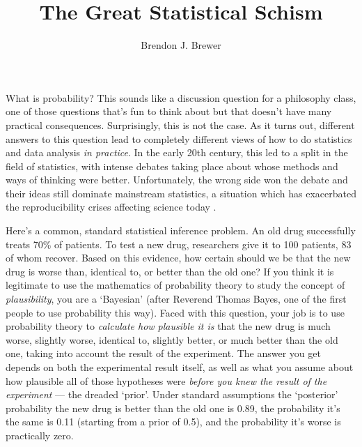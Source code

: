 \documentclass[a4paper, 12pt]{article}
\title{The Great Statistical Schism}
\author{Brendon J. Brewer}
\begin{document}
\sffamily
\maketitle

What is probability? This sounds like a discussion question for a
philosophy class, one of those questions that's fun to think about but that
doesn't have many practical consequences. Surprisingly, this is not the case.
As it turns out, different answers to this question lead to completely
different views of how to do statistics and data analysis {\em in practice}.
In the early 20th century, this led to a split in the field of statistics,
with intense debates taking place about whose methods and ways of thinking
were better. Unfortunately, the wrong side won the debate and their
ideas still dominate mainstream statistics, a situation which
has exacerbated the reproducibility crises affecting science today
\citep{reproducibility}.

Here's a common, standard statistical inference problem. An old drug
successfully treats 70\% of patients. To test a new drug, researchers give it
to 100 patients, 83 of whom recover. Based on this evidence, how certain
should we be that the new drug is worse than, identical to, or better than the
old one? If you think it is legitimate to use the mathematics of probability
theory
to study the concept of {\em plausibility}, you are a `Bayesian' (after Reverend
Thomas Bayes, one of the first people to use probability this way). Faced with
this question, your job is to use probability theory to {\em calculate how plausible it is} that the new
drug is much worse, slightly worse, identical to, slightly better, or much better
than the old one, taking into account the result of the experiment. The answer
you get
depends on both the experimental result itself, as well as what you assume
about how plausible all of those hypotheses were {\em before you knew the result
of the experiment} --- the dreaded `prior'.
Under standard assumptions the `posterior' probability the new drug is better
than the old one is 0.89, the probability it's the same is 0.11 (starting
from a prior of 0.5), and the
probability it's worse is practically zero.
\end{document}
